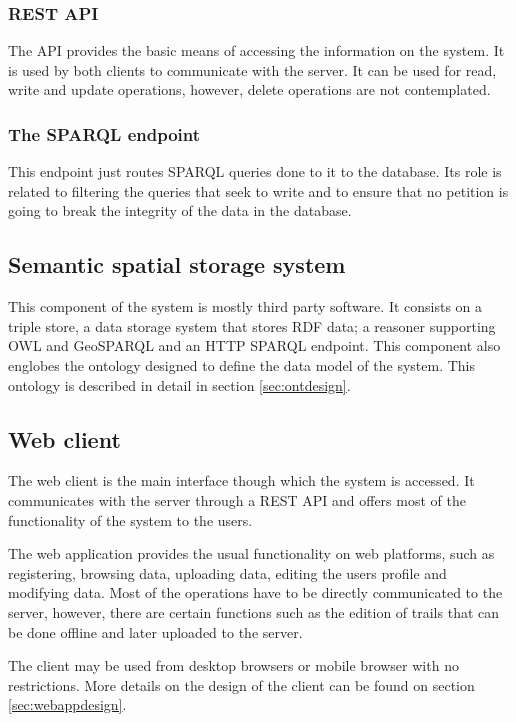 \subsubsection*{REST API}

The API provides the basic means of accessing the information on the system. It is used by both clients to communicate with the server. It can be used for read, write and update operations, however, delete operations are not contemplated.

\subsubsection*{The SPARQL endpoint}

This endpoint just routes SPARQL queries done to it to the database. Its role is related to filtering the queries that seek to write and to ensure that no petition is going to break the integrity of the data in the database.

\subsection{Semantic spatial storage system}

This component of the system is mostly third party software. It consists on a triple store, a data storage system that stores RDF data; a reasoner supporting OWL and GeoSPARQL and an HTTP SPARQL endpoint. This component also englobes the ontology designed to define the data model of the system. This ontology is described in detail in section \ref{sec:ontdesign}.

\subsection{Web client}

The web client is the main interface though which the system is accessed. It communicates with the server through a REST API and offers most of the functionality of the system to the users.

The web application provides the usual functionality on web platforms, such as registering, browsing data, uploading data, editing the users profile and modifying data. Most of the operations have to be directly communicated to the server, however, there are certain functions such as the edition of trails that can be done offline and later uploaded to the server.

The client may be used from desktop browsers or mobile browser with no restrictions. More details on the design of the client can be found on section \ref{sec:webappdesign}.

